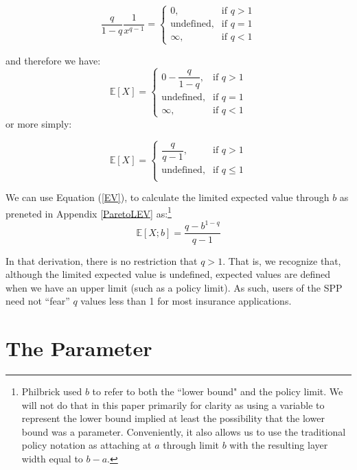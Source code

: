 \documentclass[]{article} %
\begin{document}
\[
    \frac{q}{1-q} \dfrac{1}{x^{q-1}} = 
\begin{cases}
    0,& \text{if } q > 1\\
    \text{undefined},& \text{if } q = 1\\         
    \infty, & \text{if }q < 1
\end{cases}
\]

and therefore we have: 
\[
    \mathbb{E}[X]  = 
\begin{cases}
    0 - \dfrac{q}{1-q},& \text{if } q > 1\\
    \text{undefined},& \text{if } q = 1\\         
    \infty, & \text{if }q < 1
\end{cases}
\]
or more simply:

\begin{equation}
\mathbb{E}[X]  = 
\begin{cases}
\dfrac{q}{q-1},& \text{if } q > 1\\
\text{undefined},& \text{if } q \leq 1\\         
\end{cases}
\end{equation}


We can use Equation (\ref{EV}), to calculate the limited expected value through $b$
as preneted in Appendix \ref{ParetoLEV} as:\footnote{Philbrick used $b$ to refer to both the ``lower bound" and the policy limit. We will not do that in this paper primarily for clarity as using a variable to represent the lower bound implied at least the possibility that the lower bound was a parameter. Conveniently, it also allows us  to use the traditional policy notation as attaching at $a$ through limit $b$ with the resulting layer width equal to $b - a$.} 
\begin{equation}
	\mathbb{E}[X;b] = \frac{q - b^{1-q}}{q-1}
\end{equation}

In that derivation, there is no restriction that $q > 1$. That is, we recognize that, although the limited expected value is undefined, expected values are defined when we have an upper limit (such as a policy limit). As such, users of the SPP need not ``fear'' $q$ values less than 1 for most insurance applications.

\section{The Parameter}
\end{document}
